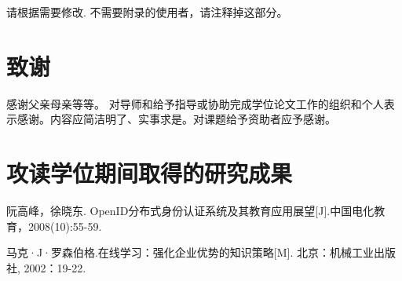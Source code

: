 \documentclass[twoside,doctor]{zjnuthesis}
\begin{document}
请根据需要修改.
不需要附录的使用者，请注释掉这部分。


\chapter{致谢}

感谢父亲母亲等等。
对导师和给予指导或协助完成学位论文工作的组织和个人表示感谢。内容应简洁明了、实事求是。对课题给予资助者应予感谢。



\chapter{攻读学位期间取得的研究成果}

\begin{enumerate}[{[}1{]}]
\item 阮高峰，徐晓东. OpenID分布式身份认证系统及其教育应用展望[J].中国电化教育，2008(10):55-59.

\item 马克·J·罗森伯格.在线学习：强化企业优势的知识策略[M]. 北京：机械工业出版社, 2002：19-22.

\end{enumerate}


\end{document}

